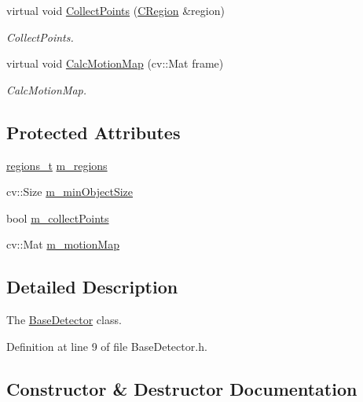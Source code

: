 \begin{DoxyCompactItemize}
virtual void \mbox{\hyperlink{class_base_detector_a20380b0980c6f262b0829f37fb89d2a7}{Collect\+Points}} (\mbox{\hyperlink{class_c_region}{C\+Region}} \&region)
\begin{DoxyCompactList}\small\item\em Collect\+Points. \end{DoxyCompactList}\item 
virtual void \mbox{\hyperlink{class_base_detector_a73c66f0d4dad263fcf65c09a6f6feda2}{Calc\+Motion\+Map}} (cv\+::\+Mat frame)
\begin{DoxyCompactList}\small\item\em Calc\+Motion\+Map. \end{DoxyCompactList}\end{DoxyCompactItemize}
\subsection*{Protected Attributes}
\begin{DoxyCompactItemize}
\item 
\mbox{\hyperlink{defines_8h_a01db0de56a20f4342820a093c5154536}{regions\+\_\+t}} \mbox{\hyperlink{class_base_detector_a409c20093acba261db8354ca72058fce}{m\+\_\+regions}}
\item 
cv\+::\+Size \mbox{\hyperlink{class_base_detector_a651b938c89c94daac4763728637d90c9}{m\+\_\+min\+Object\+Size}}
\item 
bool \mbox{\hyperlink{class_base_detector_a403cbf784fcb960bdb7d080c86c4a2ea}{m\+\_\+collect\+Points}}
\item 
cv\+::\+Mat \mbox{\hyperlink{class_base_detector_a45a2d54a0b69e271aa5c44ee301682b7}{m\+\_\+motion\+Map}}
\end{DoxyCompactItemize}


\subsection{Detailed Description}
The \mbox{\hyperlink{class_base_detector}{Base\+Detector}} class. 

Definition at line 9 of file Base\+Detector.\+h.



\subsection{Constructor \& Destructor Documentation}
\mbox{\label{class_base_detector_a3c85e13a47dd472319dc43c60f0d102a}} 
